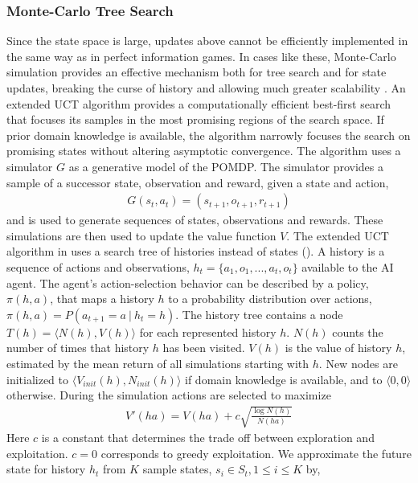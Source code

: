 \documentclass[a4paper]{article}
\begin{document}
\subsubsection{Monte-Carlo Tree Search}
Since the state space is large, updates above cannot be efficiently implemented in the same way as in perfect information games. In cases like these, Monte-Carlo simulation provides an effective mechanism both for tree search and for state updates, breaking the curse of history and allowing much greater scalability \cite{POMCP}. An extended UCT \cite{UCT} algorithm provides a computationally efficient best-first search that focuses its samples in the most promising regions of the search space. If prior domain knowledge is available, the algorithm narrowly focuses the search on promising states without altering asymptotic convergence. The algorithm uses a simulator $G$ as a generative model of the POMDP. The simulator provides a sample of a successor state, observation and reward, given a state and action,
\begin{gather*}
G(s_t, a_t)=(s_{t+1}, o_{t+1}, r_{t+1})
\end{gather*}
and is used to generate sequences of states, observations and rewards. These simulations are then used to update the value function $V$. The extended UCT algorithm in \cite{POMCP} uses a search tree of histories instead of states (). A history is a sequence of actions and observations, $h_t = {\{a_1, o_1, ..., a_t, o_t\}}$ available to the AI agent. The agent’s action-selection behavior can be described by a policy, $\pi(h, a)$, that maps a history $h$ to a probability distribution over actions, $\pi(h, a)=P(a_{t+1}=a~|~h_t=h)$. The history tree contains a node $ T(h) = \langle N(h), V (h) \rangle $ for each represented history $h$. $N(h)$ counts the number of times that history $h$ has been visited. $V(h)$ is the value of history $h$, estimated by the mean return of all simulations starting with $h$. New nodes are initialized to $\langle V_{init}(h), N_{init}(h) \rangle $ if domain knowledge is available, and to $ \langle 0, 0 \rangle$ otherwise. During the simulation actions are selected to maximize
\begin{gather*}
V'(ha) = V(ha) + c\sqrt{\frac{\log N(h)}{N(ha)}}
\end{gather*}
Here $c$ is a constant that determines the trade off between exploration and exploitation. $c=0$ corresponds to greedy exploitation. We approximate the future state for history $h_t$ from $K$ sample states, $ s_i  \in S_t, 1 \leq i \leq K $ by,
\end{document}
